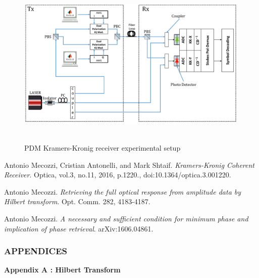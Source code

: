 \begin{figure}[h]
	\centering
	\includegraphics[width=1.0\textwidth, height=8cm]{./sdf/simplified_coherent_receiver/figures/Practical_setup_TxRx.pdf}
	\caption{PDM Kramers-Kronig receiver experimental setup}\label{Practical_setup_TxRx}
\end{figure}



\begin{thebibliography}{9}
	Antonio Mecozzi, Cristian Antonelli, and Mark Shtaif.
	\textit{Kramers-Kronig Coherent Receiver}.
	Optica, vol.3, no.11, 2016, p.1220., doi:10.1364/optica.3.001220.
	
	Antonio Mecozzi.
	\textit{Retrieving the full optical response from amplitude data by Hilbert transform}. Opt. Comm. 282, 4183-4187.
	
	Antonio Mecozzi.
	\textit{A necessary and sufficient condition for minimum phase and implication of phase retrieval}. arXiv:1606.04861.
\end{thebibliography}










\subsubsection{\textbf{APPENDICES}}
\textbf{Appendix A : Hilbert Transform}\\


